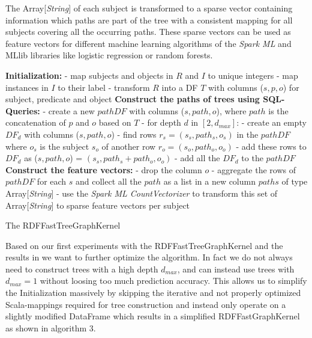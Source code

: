 \documentclass{easychair}
\begin{document}
The Array[\textit{String}] of each subject is transformed to a sparse vector containing information which paths are part of the tree with a consistent mapping for all subjects covering all the occurring paths. These sparse vectors can be used as feature vectors for different machine learning algorithms of the \textit{Spark ML} and {MLlib} libraries like logistic regression or random forests.
\begin{algorithm}
 \label{alg:FTGK}
 \;
 \textbf{Initialization:}\; \Indp
 - map subjects and objects in $R$ and $I$ to unique integers\;
 - map instances in $I$ to their label\;
 - transform $R$ into a DF $T$ with columns ($s,p,o$) for subject, predicate and object\; \Indm
\; 
\textbf{Construct the paths of trees using SQL-Queries:}\; \Indp
- create a new $pathDF$ with columns ($s,path,o$), where $path$ is the concatenation of $p$ and $o$ based on $T$\;
- for depth $d$ in $[2,d_{max}]$:\; \Indp
- create an empty $DF_d$ with columns ($s,path,o$)\;
- find rows $r_s = (s_s,path_s,o_s)$ in the $pathDF$ where $o_s$ is the subject $s_o$ of another row $r_o=(s_o,path_o,o_o)$\;
- add these rows to $DF_d$ as ($s,path,o$) = $(s_s,path_s+path_o,o_o)$\; \Indm
- add all the $DF_d$ to the $pathDF$\; \Indm
 \;
 \textbf{Construct the feature vectors:}\; \Indp
 - drop the column $o$\;
 - aggregate the rows of $pathDF$ for each $s$ and collect all the $path$ as a list in a new column $paths$ of type Array[\textit{String}]\;
 - use the \textit{Spark ML CountVectorizer} to transform this set of Array[\textit{String}] to sparse feature vectors per subject\;
\caption{The RDFFastTreeGraphKernel}
\end{algorithm}

Based on our first experiments with the RDFFastTreeGraphKernel and the results in \cite{FGK} we want to further optimize the algorithm. In fact we do not always need to construct trees with a high depth $d_{max}$, and can instead use trees with $d_{max}=1$ without loosing too much prediction accuracy. This allows us to simplify the Initialization massively by skipping the iterative and not properly optimized Scala-mappings required for tree construction and instead only operate on a slightly modified DataFrame which results in a simplified RDFFastGraphKernel as shown in algorithm 3.
\end{document}
